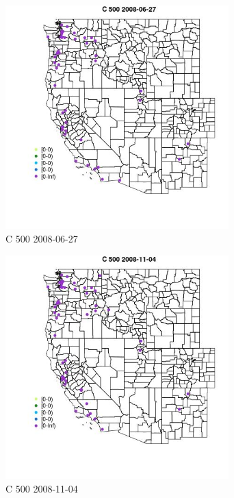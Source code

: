 \begin{figure} 
\centering  
\includegraphics[width=0.77\textwidth]{Code_Outputs/Report_ML_input_PM25_Step4_part_e_de_duplicated_aves_MapObsC_5002008-06-27.jpg} 
\caption{\label{fig:Report_ML_input_PM25_Step4_part_e_de_duplicated_avesMapObsC_5002008-06-27}C 500 2008-06-27} 
\end{figure} 
 

\begin{figure} 
\centering  
\includegraphics[width=0.77\textwidth]{Code_Outputs/Report_ML_input_PM25_Step4_part_e_de_duplicated_aves_MapObsC_5002008-11-04.jpg} 
\caption{\label{fig:Report_ML_input_PM25_Step4_part_e_de_duplicated_avesMapObsC_5002008-11-04}C 500 2008-11-04} 
\end{figure} 
 

